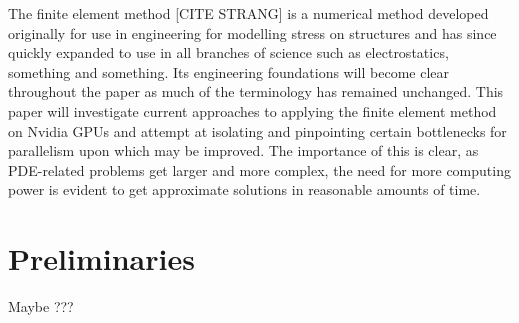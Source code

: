 The finite element method [CITE STRANG] is a numerical method developed originally for use in engineering for modelling stress on structures and has since quickly expanded to use in all branches of science such as electrostatics, something and something. Its engineering foundations will become clear throughout the paper as much of the terminology has remained unchanged. This paper will investigate current approaches to applying the finite element method on Nvidia GPUs and attempt at isolating and pinpointing certain bottlenecks for parallelism upon which may be improved. The importance of this is clear, as PDE-related problems get larger and more complex, the  need for more computing power is evident to get approximate solutions in reasonable amounts of time.


\section{Preliminaries}
Maybe ???